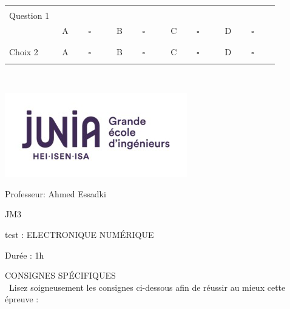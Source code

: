 \documentclass{book}%
\begin{document}
\begin{center}%
\begin{tabular}{| l l l l l |}%
\hline%
 & & & & \\%
Question 1\qquad \qquad\ & & & & \\%
 & A $\qquad \square \qquad$ & B $\qquad \square \qquad$ & C $\qquad \square \qquad$ & D $\qquad \square \qquad$ \\ %
 & & & &  \\%
\hline%
 & & & &  \\%
Choix 2 & A $\qquad \square \qquad$ & B $\qquad \square \qquad$ & C $\qquad \square \qquad$ & D $\qquad \square \qquad$ \\ %
 & & & &  \\%
\hline%
\end{tabular}%
\\ \vskip3mm%
\thispagestyle{empty}%
\end{center}%
\newpage%
\thispagestyle{empty}%
\vskip-40mm	\includegraphics[scale=0.5]{logo.png} \\%
 \begin{flushright}  \vskip-20mm   Professeur: Ahmed Essadki\vskip15mm  \end{flushright}%
JM3%
\begin{center}   \begin{Large}test : ELECTRONIQUE NUMÉRIQUE\end{Large} \end{center}%
Durée : 1h%
 \begin{center} { \large CONSIGNES SPÉCIFIQUES } \\\ Lisez soigneusement les consignes ci-dessous afin de réussir au mieux cette épreuve : \end{center} %
\end{document}
